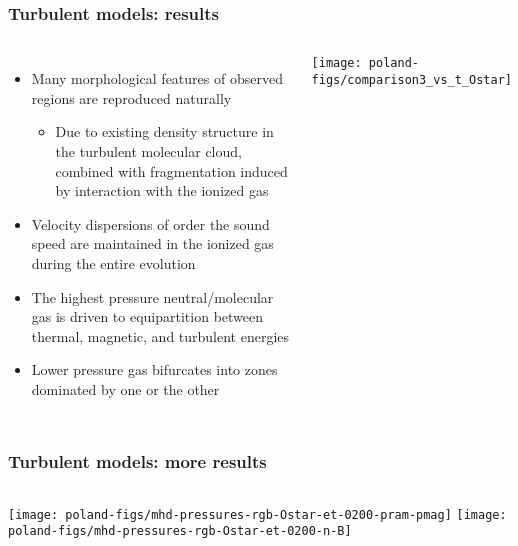 \documentclass[presentation]{beamer}
\begin{document}
\begin{frame}
  \frametitle{Turbulent models: results}
  \begin{columns}
    \begin{itemize}
    \item Many morphological features of observed \hii{} regions are
      reproduced naturally
      \begin{itemize}
      \item Due to existing density structure in the
        turbulent molecular cloud, combined with fragmentation induced
        by interaction with the ionized gas
      \end{itemize}
    \item Velocity dispersions of order the sound speed are
      maintained in the ionized gas during the entire evolution
    \item The highest pressure neutral/molecular gas is driven to
      equipartition between thermal, magnetic, and turbulent energies
    \item Lower pressure gas bifurcates into zones dominated by one or
      the other
    \end{itemize}
    \texttt{[image: poland-figs/comparison3\_vs\_t\_Ostar]}%
  \end{columns}
\end{frame}

\begin{frame}
  \frametitle{Turbulent models: more results}
  \begin{columns}
    \texttt{[image: poland-figs/mhd-pressures-rgb-Ostar-et-0200-pram-pmag]}
    \texttt{[image: poland-figs/mhd-pressures-rgb-Ostar-et-0200-n-B]}
  \end{columns}
\end{frame}

{
  \usebackgroundtemplate{
    \parbox[c][\paperheight][c]{\paperwidth}{\missingmovietext}
  }
\begin{frame}[plain]%
\hspace*{-1ex}
\end{frame}
}
\end{document}
